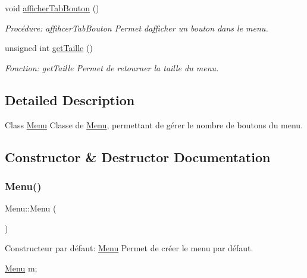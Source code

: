 \begin{DoxyCompactItemize}
void \hyperlink{classMenu_af01f5f26519658b6e0fd92fdb8eda6fe}{afficher\+Tab\+Bouton} ()
\begin{DoxyCompactList}\small\item\em Procédure\+: affihcer\+Tab\+Bouton Permet d\textquotesingle{}afficher\textquotesingle{} un bouton dans le menu. \end{DoxyCompactList}\item 
unsigned int \hyperlink{classMenu_a0a114609fcaf58b130a44a14e341117e}{get\+Taille} ()
\begin{DoxyCompactList}\small\item\em Fonction\+: get\+Taille Permet de retourner la taille du menu. \end{DoxyCompactList}\end{DoxyCompactItemize}


\subsection{Detailed Description}
Class \hyperlink{classMenu}{Menu} Classe de \hyperlink{classMenu}{Menu}, permettant de gérer le nombre de boutons du menu. 

\subsection{Constructor \& Destructor Documentation}
\mbox{\label{classMenu_ad466dd83355124a6ed958430450bfe94}} 
\subsubsection{\texorpdfstring{Menu()}{Menu()}\hspace{0.1cm}{\footnotesize\ttfamily [1/3]}}
{\footnotesize\ttfamily Menu\+::\+Menu (\begin{DoxyParamCaption}{ }\end{DoxyParamCaption})}



Constructeur par défaut\+: \hyperlink{classMenu}{Menu} Permet de créer le menu par défaut. 


\begin{DoxyCode}
\hyperlink{classMenu}{Menu} m;
\end{DoxyCode}
 \mbox{\label{classMenu_a255104f828234493ca62a43d144d2573}} 
